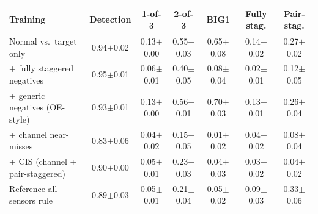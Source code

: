 \setlength{\tabcolsep}{3pt}
\begin{tabular}{lcccccc}
\toprule
Training & Detection & 1-of-3 & 2-of-3 & BIG1 & Fully stag. & Pair-stag.\\
\midrule
Normal vs.\ target only & 0.94$\pm$0.02 & 0.13$\pm$0.00 & 0.55$\pm$0.03 & 0.65$\pm$0.08 & 0.14$\pm$0.02 & 0.27$\pm$0.02\\
+ fully staggered negatives & 0.95$\pm$0.01 & 0.06$\pm$0.01 & 0.40$\pm$0.05 & 0.08$\pm$0.04 & 0.02$\pm$0.01 & 0.12$\pm$0.05\\
+ generic negatives (OE-style) & 0.93$\pm$0.01 & 0.13$\pm$0.00 & 0.56$\pm$0.01 & 0.70$\pm$0.03 & 0.13$\pm$0.01 & 0.26$\pm$0.04\\
+ channel near-misses & 0.83$\pm$0.06 & 0.04$\pm$0.02 & 0.15$\pm$0.05 & 0.01$\pm$0.02 & 0.04$\pm$0.02 & 0.08$\pm$0.04\\
+ CIS (channel + pair-staggered) & 0.90$\pm$0.00 & 0.05$\pm$0.01 & 0.23$\pm$0.03 & 0.04$\pm$0.03 & 0.03$\pm$0.02 & 0.04$\pm$0.02\\
\midrule
Reference all-sensors rule & 0.89$\pm$0.03 & 0.05$\pm$0.01 & 0.21$\pm$0.04 & 0.05$\pm$0.02 & 0.09$\pm$0.03 & 0.33$\pm$0.06\\
\bottomrule
\end{tabular}
